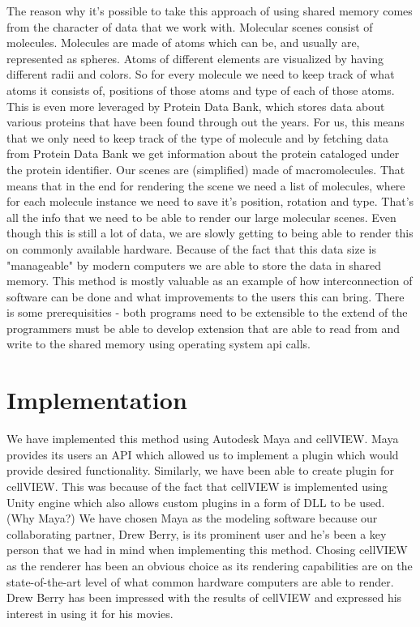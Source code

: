 \documentclass[
  digital, %
  table,   %
  lof,     %
  lot,     %
]{fithesis3}
\begin{document}
{The reason why it's possible to take this approach of using shared memory comes from the character of data that we work with. Molecular scenes consist of molecules. Molecules are made of atoms which can be, and usually are, represented as spheres. Atoms of different elements are visualized by having different radii and colors. So for every molecule we need to keep track of what atoms it consists of, positions of those atoms and type of each of those atoms. This is even more leveraged by Protein Data Bank, which stores data about various proteins that have been found through out the years. For us, this means that we only need to keep track of the type of molecule and by fetching data from Protein Data Bank we get information about the protein cataloged under the protein identifier. Our scenes are (simplified) made of macromolecules. That means that in the end for rendering the scene we need a list of molecules, where for each molecule instance we need to save it's position, rotation and type. That's all the info that we need to be able to render our large molecular scenes. Even though this is still a lot of data, we are slowly getting to being able to render this on commonly available hardware. Because of the fact that this data size is "manageable" by modern computers we are able to store the data in shared memory.
This method is mostly valuable as an example of how interconnection of software can be done and what improvements to the users this can bring. There is some prerequisities - both programs need to be extensible to the extend of the programmers must be able to develop extension that are able to read from and write to the shared memory using operating system api calls.

\chapter{Implementation}
We have implemented this method using Autodesk Maya and cellVIEW. Maya provides its users an API which allowed us to implement a plugin which would provide desired functionality. Similarly, we have been able to create plugin for cellVIEW. This was because of the fact that cellVIEW is implemented using Unity engine which also allows custom plugins in a form of DLL to be used.
(Why Maya?) We have chosen Maya as the modeling software because our collaborating partner, Drew Berry, is its prominent user and he's been a key person that we had in mind when implementing this method. Chosing cellVIEW as the renderer has been an obvious choice as its rendering capabilities are on the state-of-the-art level of what common hardware computers are able to render. Drew Berry has been impressed with the results of cellVIEW and expressed his interest in using it for his movies.

}
\end{document}

